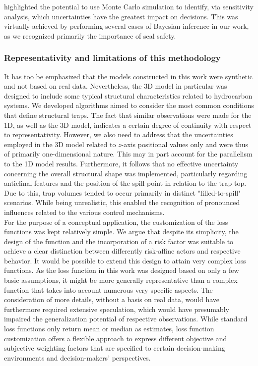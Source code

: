 	\citet{bratvold2010making} highlighted the potential to use Monte Carlo simulation to identify, via sensitivity analysis, which uncertainties have the greatest impact on decisions. This was virtually achieved by performing several cases of Bayesian inference in our work, as we recognized primarily the importance of seal safety.		
	\subsubsection{Representativity and limitations of this methodology}
	It has too be emphasized that the models constructed in this work were synthetic and not based on real data. Nevertheless, the 3D model in particular was designed to include some typical structural characteristics related to hydrocarbon systems. We developed algorithms aimed to consider the most common conditions that define structural traps. The fact that similar observations were made for the 1D, as well as the 3D model, indicates a certain degree of continuity with respect to representativity. However, we also need to address that the uncertainties employed in the 3D model related to $z$-axis positional values only and were thus of primarily one-dimensional nature. This may in part account for the parallelism to the 1D model results. Furthermore, it follows that no effective uncertainty concerning the overall structural shape was implemented, particularly regarding anticlinal features and the position of the spill point in relation to the trap top. Due to this, trap volumes tended to occur primarily in distinct "filled-to-spill" scenarios. While being unrealistic, this enabled the recognition of pronounced influences related to the various control mechanisms.\\	
	For the purpose of a conceptual application, the customization of the loss functions was kept relatively simple. We argue that despite its simplicity, the design of the function and the incorporation of a risk factor was suitable to achieve a clear distinction between differently risk-affine actors and respective behavior. It would be possible to extend this design to attain very complex loss functions. As the loss function in this work was designed based on only a few basic assumptions, it might be more generally representative than a complex function that takes into account numerous very specific aspects. The consideration of more details, without a basis on real data, would have furthermore required extensive speculation, which would have presumably impaired the generalization potential of respective observations. While standard loss functions only return mean or median as estimates, loss function customization offers a flexible approach to express different objective and subjective weighting factors that are specified to certain decision-making environments and decision-makers' perspectives.
